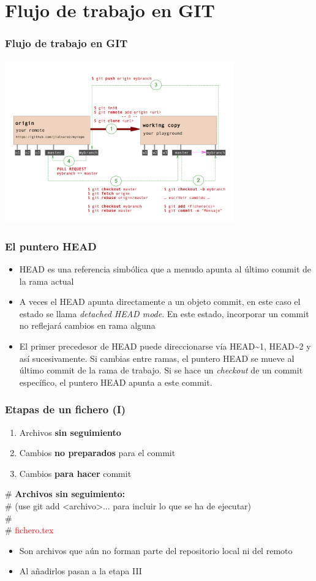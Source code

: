 \section{Flujo de trabajo en GIT}
\frame
{
\frametitle{Flujo de trabajo en GIT}
\begin{center}
 \includegraphics[height=7cm]{imgs/gitworkflow.png}
\end{center}
}

\frame
{
\frametitle{El puntero HEAD}
\begin{itemize}
 \item HEAD es una referencia simbólica que a menudo apunta al último commit de la rama actual
 \item A veces el HEAD apunta directamente a un objeto commit, en este caso el estado se llama \textit{detached HEAD mode}. En este estado, incorporar un commit no reflejará cambios en rama alguna
 \item El primer precedesor de HEAD puede direccionarse vía HEAD\textasciitilde1, HEAD\textasciitilde2 y así sucesivamente. Si cambias entre ramas, el puntero HEAD se mueve al último commit de la rama de trabajo. Si se hace un \textit{checkout} de un commit específico, el puntero HEAD apunta a este commit.
\end{itemize}
}

\frame
{
\frametitle{Etapas de un fichero (I)}
\begin{enumerate}
 \item Archivos \textbf{sin seguimiento}
 \item Cambios \textbf{no preparados} para el commit
 \item Cambios \textbf{para hacer} commit
\end{enumerate}

\begin{framed}
\# \textbf{Archivos sin seguimiento:}\\
\#   (use git add <archivo>... para incluir lo que se ha de ejecutar)\\
\#\\
\#	\textcolor{red}{fichero.tex}
\end{framed}

\begin{itemize}
 \item Son archivos que aún no forman parte del repositorio local ni del remoto
 \item Al añadirlos pasan a la etapa III
\end{itemize}
}

